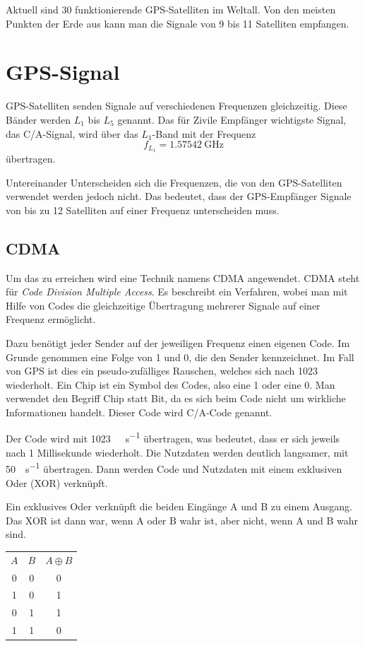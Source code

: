 \documentclass[12pt,a4paper]{scrartcl}
\begin{document}
Aktuell sind 30 funktionierende GPS-Satelliten im Weltall. Von den meisten Punkten der Erde aus kann man die Signale von 9 bis 11 Satelliten empfangen.

\section{GPS-Signal}
GPS-Satelliten senden Signale auf verschiedenen Frequenzen gleichzeitig. Diese Bänder werden $L_1$ bis $L_5$ genannt. Das für Zivile Empfänger wichtigste Signal, das C/A-Signal, wird über das $L_1$-Band mit der Frequenz
\begin{equation}
f_{L_1} = \SI{1.57542}{\giga\hertz} \nonumber
\end{equation}
übertragen.

Untereinander Unterscheiden sich die Frequenzen, die von den GPS-Satelliten verwendet werden jedoch nicht. Das bedeutet, dass der GPS-Empfänger Signale von bis zu 12 Satelliten auf einer Frequenz unterscheiden muss.

\subsection{CDMA}

Um das zu erreichen wird eine Technik namens CDMA angewendet.
CDMA steht für \emph{Code Division Multiple Access}. Es beschreibt ein Verfahren, wobei man mit Hilfe von Codes die gleichzeitige Übertragung mehrerer Signale auf einer Frequenz ermöglicht.

Dazu benötigt jeder Sender auf der jeweiligen Frequenz einen eigenen Code. Im Grunde genommen eine Folge von 1 und 0, die den Sender kennzeichnet. Im Fall von GPS ist dies ein pseudo-zufälliges Rauschen, welches sich nach \SI{1023}{\chip} wiederholt. Ein Chip ist ein Symbol des Codes, also eine 1 oder eine 0. Man verwendet den Begriff Chip statt Bit, da es sich beim Code nicht um wirkliche Informationen handelt. Dieser Code wird C/A-Code genannt.

Der Code wird mit \SI{1023}{\mega\chip\per\second} übertragen, was bedeutet, dass er sich jeweils nach 1 Millisekunde wiederholt.
Die Nutzdaten werden deutlich langsamer, mit \SI{50}{\bit\per\second} übertragen. Dann werden Code und Nutzdaten mit einem exklusiven Oder (XOR) verknüpft.

Ein exklusives Oder verknüpft die beiden Eingänge A und B zu einem Ausgang. Das XOR ist dann war, wenn A oder B wahr ist, aber nicht, wenn A und B wahr sind.

\begin{center}
\begin{tabular}{cc|c}
\textbf{$A$} & \textbf{$B$} & \textbf{$A\oplus B$} \\
0 & 0 & 0 \\
1 & 0 & 1 \\
0 & 1 & 1 \\
1 & 1 & 0 \\
\end{tabular}
\end{center}
\end{document}
